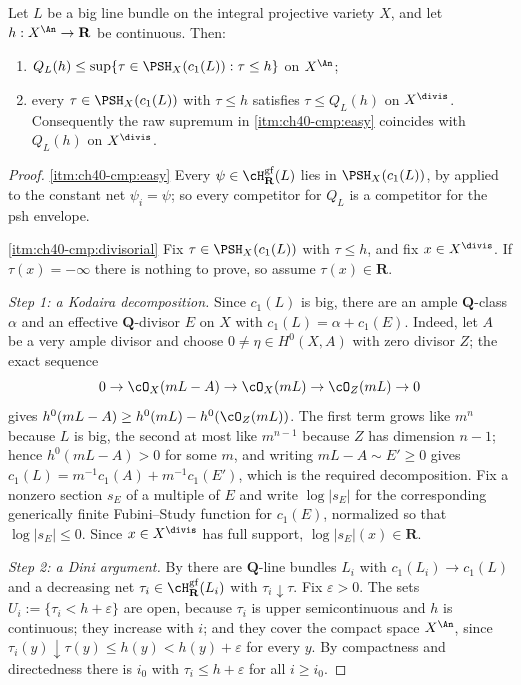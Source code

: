 \begin{proposition}
\label{prop:ch40-envelope-comparison}
Let $L$ be a big line bundle on the integral projective variety $X$, and
let $h:X^{\An}\to\mathbf R$ be continuous.  Then:
\begin{enumerate}
\item\label{itm:ch40-cmp:easy}
 $Q_L(h)\le\sup\{\tau\in\PSH_X(c_1(L)):\tau\le h\}$ on $X^{\An}$;
\item\label{itm:ch40-cmp:divisorial}
 every $\tau\in\PSH_X(c_1(L))$ with $\tau\le h$ satisfies
 $\tau\le Q_L(h)$ on $X^{\divis}$.  Consequently the raw supremum in
 \cref{itm:ch40-cmp:easy} coincides with $Q_L(h)$ on $X^{\divis}$.
\end{enumerate}
\end{proposition}

\begin{proof}
\cref{itm:ch40-cmp:easy}  Every
$\psi\in\cH^{\mathrm{gf}}_{\mathbf R}(L)$ lies in $\PSH_X(c_1(L))$, by
 applied to the constant net $\psi_i=\psi$; so every
competitor for $Q_L$ is a competitor for the psh envelope.

\cref{itm:ch40-cmp:divisorial}  Fix $\tau\in\PSH_X(c_1(L))$ with
$\tau\le h$, and fix $x\in X^{\divis}$.  If $\tau(x)=-\infty$ there is
nothing to prove, so assume $\tau(x)\in\mathbf R$.

\emph{Step 1: a Kodaira decomposition.}  Since $c_1(L)$ is big, there are
an ample $\mathbf Q$-class $\alpha$ and an effective
$\mathbf Q$-divisor $E$ on $X$ with
$c_1(L)=\alpha+c_1(E)$.  Indeed, let $A$ be a very ample divisor and
choose $0\ne\eta\in H^0(X,A)$ with zero divisor $Z$; the exact sequence
\[
 0\to\cO_X(mL-A)\to\cO_X(mL)\to\cO_Z(mL)\to0
\]
gives $h^0(mL-A)\ge h^0(mL)-h^0(\cO_Z(mL))$.  The first term grows like
$m^n$ because $L$ is big, the second at most like $m^{n-1}$ because
$Z$ has dimension $n-1$; hence $h^0(mL-A)>0$ for some $m$, and
writing $mL-A\sim E'\ge0$ gives
$c_1(L)=m^{-1}c_1(A)+m^{-1}c_1(E')$, which is the required decomposition.
Fix a nonzero section $s_E$ of a multiple of $E$ and write
$\log|s_E|$ for the corresponding generically finite Fubini--Study
function for $c_1(E)$, normalized so that $\log|s_E|\le0$.  Since
$x\in X^{\divis}$ has full support, $\log|s_E|(x)\in\mathbf R$.

\emph{Step 2: a Dini argument.}  By  there are
$\mathbf Q$-line bundles $L_i$ with $c_1(L_i)\to c_1(L)$ and a
decreasing net $\tau_i\in\cH^{\mathrm{gf}}_{\mathbf R}(L_i)$ with
$\tau_i\downarrow\tau$.  Fix $\varepsilon>0$.  The sets
$U_i:=\{\tau_i<h+\varepsilon\}$ are open, because $\tau_i$ is upper
semicontinuous and $h$ is continuous; they increase with $i$; and they
cover the compact space $X^{\An}$, since $\tau_i(y)\downarrow\tau(y)\le
h(y)<h(y)+\varepsilon$ for every $y$.  By compactness and directedness
there is $i_0$ with $\tau_i\le h+\varepsilon$ for all $i\ge i_0$.


\end{proof}
